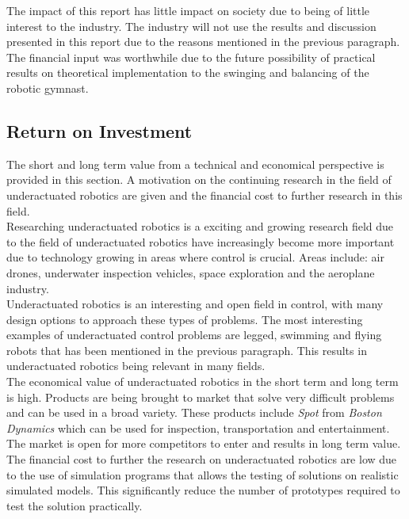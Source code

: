The impact of this report has little impact on society due to being of little interest to the industry. The industry will not use the results and discussion presented in this report due to the reasons mentioned in the previous paragraph.\\

The financial input was worthwhile due to the future possibility of practical results on theoretical implementation to the swinging and balancing of the robotic gymnast.\\


\subsection{Return on Investment}
The short and long term value from a technical and economical perspective is provided in this section. A motivation on the continuing research in the field of underactuated robotics are given and the financial cost to further research in this field.\\

Researching underactuated robotics is a exciting and growing research field due to the field of underactuated robotics have increasingly become more important due to technology growing in areas where control is crucial. Areas include: air drones, underwater inspection vehicles, space exploration and the aeroplane industry. \\

Underactuated robotics is an interesting and open field in control, with many design options to approach these types of problems. The most interesting examples of underactuated control problems are legged, swimming and flying robots that has been mentioned in the previous paragraph. This results in underactuated robotics being relevant in many fields.\\

The economical value of underactuated robotics in the short term and long term is high. Products are being brought to market that solve very difficult problems and can be used in a broad variety. These products include \textit{Spot} from \textit{Boston Dynamics} which can be used for inspection, transportation and entertainment. The market is open for more competitors to enter and results in long term value.\\

The financial cost to further the research on underactuated robotics are low due to the use of simulation programs that allows the testing of solutions on realistic simulated models. This significantly reduce the number of prototypes required to test the solution practically. 

